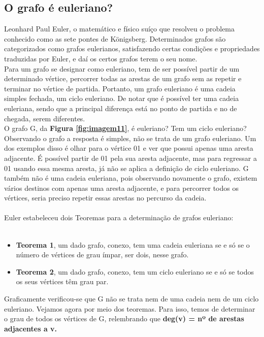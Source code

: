 \subsection{O grafo é euleriano?}
\indent Leonhard Paul Euler, o matemático e físico suíço que resolveu o problema conhecido como as sete pontes de Königsberg. 
Determinados grafos são categorizados como grafos eulerianos, satisfazendo certas condições
e propriedades traduzidas por Euler, e daí os certos grafos terem o seu nome.\\
\indent Para um grafo se designar como euleriano, tem de ser possível partir de um determinado vértice,
percorrer todas as arestas de um grafo sem as repetir e terminar no vértice de partida. Portanto, um grafo 
euleriano é uma cadeia simples fechada, um ciclo euleriano. De notar que é possível ter uma cadeia euleriana, 
sendo que a principal diferença está no ponto de partida e no de chegada, serem diferentes.\\
\indent O grafo G, da \textbf{Figura \ref*{fig:imagem11}}, é euleriano? Tem um ciclo euleriano? Observando o grafo a resposta é simples, 
não se trata de um grafo euleriano. Um dos exemplos disso é olhar para o vértice 01 e ver que possui apenas 
uma aresta adjacente. É possível partir de 01 pela sua aresta adjacente, mas para regressar a 01 usando essa 
mesma aresta, já não se aplica a definição de ciclo euleriano. G também não é uma cadeia euleriana, pois
observando novamente o grafo, existem vários destinos com apenas uma aresta adjacente, e para percorrer 
todos os vértices, seria preciso repetir essas arestas no percurso da cadeia.\\
\\
\indent Euler estabeleceu dois Teoremas para a determinação de grafos euleriano:\\
\\
\begin{itemize}
\item 
\textbf{Teorema 1}, um dado grafo, conexo, tem uma cadeia euleriana se e só se o número de vértices de grau ímpar, ser dois, nesse grafo.
\item 
\textbf{Teorema 2}, um dado grafo, conexo, tem um ciclo euleriano se e só se todos os seus vértices têm grau par.
\end{itemize}
\indent Graficamente verificou-se que G não se trata nem de uma cadeia nem de um ciclo euleriano. Vejamos 
agora por meio dos teoremas. Para isso, temos de determinar o grau de todos os vértices de G, relembrando 
que \textbf{deg(v) = nº de arestas adjacentes a v.} \\

